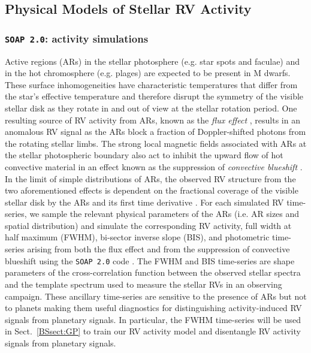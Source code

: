 \subsection{Physical Models of Stellar RV Activity} \label{BSsect:activity}
\subsubsection{\texttt{SOAP 2.0}: activity simulations} \label{BSsect:soap}
Active regions (ARs) in the stellar photosphere (e.g. star spots and faculae) and in
the hot chromosphere (e.g. plages) are expected to be present in M dwarfs. These surface inhomogeneities
have characteristic temperatures that differ from the star's effective temperature and therefore 
disrupt the symmetry of the visible stellar disk as they rotate in and out of view at the stellar rotation
period. One resulting source of RV activity from ARs, known as the \emph{flux effect} \citep{dumusque14},
results in an anomalous RV signal as the ARs block a fraction of Doppler-shifted
photons from the rotating stellar limbs. The strong local magnetic fields associated with ARs
at the stellar photospheric boundary also act to inhibit the upward flow of hot convective material
in an effect known as the suppression of \emph{convective blueshift} \citep{dravins81}. \\

In the limit of simple distributions of ARs, the observed RV structure from the two aforementioned effects 
is dependent on the fractional coverage of the visible stellar disk by the ARs and its first time
derivative \citep{aigrain12}. For each simulated RV time-series, we sample the relevant physical
parameters of the ARs (i.e. AR sizes and spatial distribution) and 
simulate the corresponding RV activity, full width at half maximum (FWHM), bi-sector inverse slope (BIS),
and photometric time-series arising from both the flux effect and from the suppression of convective blueshift 
using the \texttt{SOAP 2.0} code \citep{dumusque14}. The FWHM and BIS time-series are shape parameters of
the cross-correlation function between the observed stellar spectra and the template spectrum used to measure
the stellar RVs in an observing campaign. These ancillary time-series are sensitive to the presence of ARs but not to planets
making them useful diagnostics for distinguishing activity-induced RV signals from planetary signals.
In particular, the FWHM time-series will be used in
Sect.~\ref{BSsect:GP} to train our RV activity model and disentangle RV activity signals from planetary signals. \\


